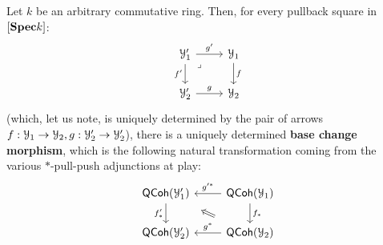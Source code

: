                 \begin{definition} \label{def: base_change_morphisms}
                    Let $k$ be an arbitrary commutative ring. Then, for every pullback square in $[\mathbf{Spec} k]$:
                        $$
                            \begin{tikzcd}
                            	{\calY_1'} & {\calY_1} \\
                            	{\calY_2'} & {\calY_2}
                            	\arrow["\lrcorner"{anchor=center, pos=0.125}, draw=none, from=1-1, to=2-2]
                            	\arrow["{f'}"', from=1-1, to=2-1]
                            	\arrow["g", from=2-1, to=2-2]
                            	\arrow["f", from=1-2, to=2-2]
                            	\arrow["{g'}", from=1-1, to=1-2]
                            \end{tikzcd}
                        $$
                    (which, let us note, is uniquely determined by the pair of arrows $f: \mathcal{Y}_1 \to \mathcal{Y}_2, g: \mathcal{Y}_2' \to \mathcal{Y}_2'$), there is a uniquely determined \textbf{base change morphism}, which is the following natural transformation coming from the various $*$-pull-push adjunctions at play:
                        $$
                            \begin{tikzcd}
                            	{\QCoh(\calY_1')} & {\QCoh(\calY_1)} \\
                            	{\QCoh(\calY_2')} & {\QCoh(\calY_2)}
                            	\arrow["{g^*}"', from=2-2, to=2-1]
                            	\arrow["{f'_*}"', from=1-1, to=2-1]
                            	\arrow["{f_*}", from=1-2, to=2-2]
                            	\arrow["{g'^*}"', from=1-2, to=1-1]
                            	\arrow[shorten <=14pt, shorten >=14pt, Rightarrow, from=2-2, to=1-1]
                            \end{tikzcd}
                        $$
                \end{definition}
